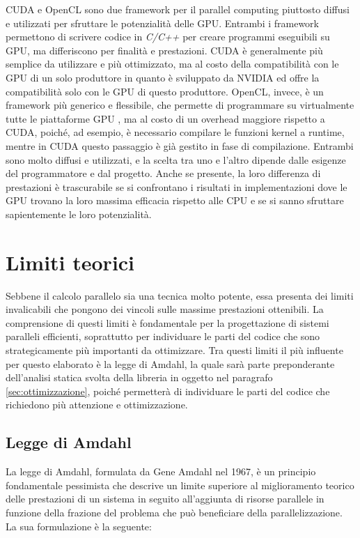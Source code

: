 CUDA e OpenCL sono due framework per il parallel computing piuttosto diffusi e
utilizzati per sfruttare le potenzialità delle GPU. Entrambi i framework permettono
di scrivere codice in \textit{C/C++} per creare programmi eseguibili su GPU, ma differiscono
per finalità e prestazioni. CUDA è generalmente più semplice da utilizzare e più
ottimizzato, ma al costo della compatibilità con le GPU di un solo produttore in
quanto è sviluppato da NVIDIA ed offre la compatibilità solo con le GPU di questo
produttore. OpenCL, invece, è un framework più generico e flessibile, che permette
di programmare su virtualmente tutte le piattaforme GPU , ma al costo di un overhead
maggiore rispetto a CUDA, poiché, ad esempio, è necessario compilare le funzioni
kernel a runtime, mentre in CUDA questo passaggio è già gestito in fase di compilazione.
Entrambi sono molto diffusi e utilizzati, e la scelta tra uno e l'altro dipende dalle
esigenze del programmatore e dal progetto. Anche se presente, la loro differenza
di prestazioni è trascurabile se si confrontano i risultati in implementazioni dove
le GPU trovano la loro massima efficacia rispetto alle CPU e se si sanno sfruttare
sapientemente le loro potenzialità.

\section{Limiti teorici}
\label{sec:limititeorici}

Sebbene il calcolo parallelo sia una tecnica molto potente, essa presenta dei limiti
invalicabili che pongono dei vincoli sulle massime prestazioni ottenibili. La
comprensione di questi limiti è fondamentale per la progettazione di sistemi
paralleli efficienti, soprattutto per individuare le parti del codice che sono strategicamente
più importanti da ottimizzare. Tra questi limiti il più influente per questo
elaborato è la legge di Amdahl, la quale sarà parte preponderante dell'analisi statica
svolta della libreria in oggetto nel paragrafo \ref{sec:ottimizzazione}, poiché
permetterà di individuare le parti del codice che richiedono più attenzione e
ottimizzazione.

\subsection{Legge di Amdahl}
\label{sec:amdahl}

La legge di Amdahl, formulata da Gene Amdahl nel 1967, è un principio fondamentale
pessimista che descrive un limite superiore al miglioramento teorico delle prestazioni
di un sistema in seguito all'aggiunta di risorse parallele in funzione della frazione
del problema che può beneficiare della parallelizzazione. La sua formulazione è
la seguente:

